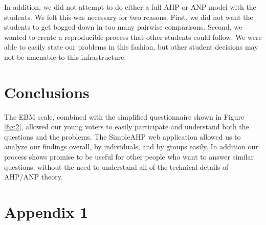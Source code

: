 \documentclass[11pt]{article}
\begin{document}
In addition, we did not attempt to do either a full AHP or ANP model with
the students.  We felt this was necessary for two reasons.  First, we did not
want the students to get bogged down in too many pairwise comparisons.  Second, we
wanted to create a reproducible process that other students could follow.  We were
able to easily state our problems in this fashion, but other student decisions may
not be amenable to this infrastructure.

\section{Conclusions}
The EBM scale, combined with the simplified questionnaire 
shown in Figure \ref{fig:2},
allowed our young voters to easily participate and understand both the 
questions and the
problems.  The SimpleAHP web application allowed us to analyze our findings overall, by
individuals, and by groups easily.  In addition our process shows promise
to be useful for
other people who want to answer similar questions, without the need to 
understand all of the
technical details of AHP/ANP theory.





 \section{Appendix 1}
 
\end{document}

